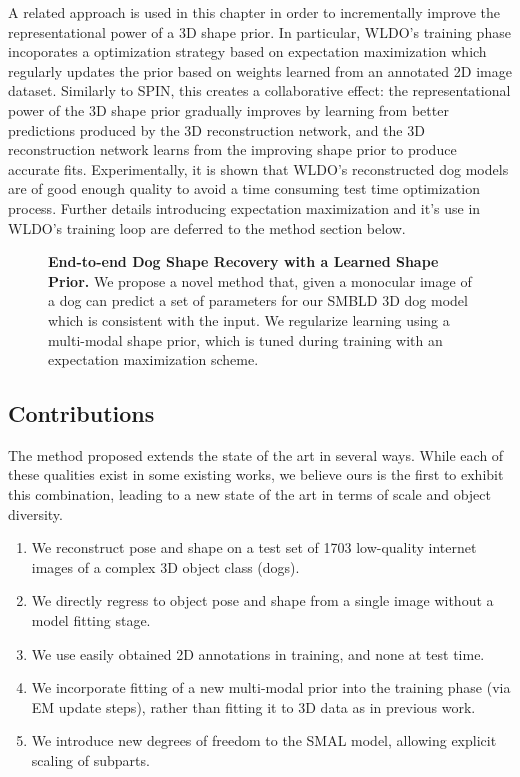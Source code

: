 A related approach is used in this chapter in order to incrementally improve the representational power of a 3D shape prior. In particular, WLDO's training phase incoporates a optimization strategy based on expectation maximization which regularly updates the prior based on weights learned from an annotated 2D image dataset. Similarly to SPIN, this creates a collaborative effect: the representational power of the 3D shape prior gradually improves by learning from better predictions produced by the 3D reconstruction network, and the 3D reconstruction network learns from the improving shape prior to produce accurate fits. Experimentally, it is shown that WLDO's reconstructed dog models are of good enough quality to avoid a time consuming test time optimization process. Further details introducing expectation maximization and it's use in WLDO's training loop are deferred to the method section below.


\begin{figure}[t]
\medbreak
\caption{
\textbf{End-to-end Dog Shape Recovery with a Learned Shape Prior.}
We propose a novel method that, given a monocular image of a dog can predict a set of parameters for our SMBLD 3D dog model which is consistent with the input. We regularize learning using a multi-modal shape prior, which is tuned during training with an expectation maximization scheme.\label{fig:splash}}
\end{figure}

\subsection{Contributions}

The method proposed extends the state of the art in several ways.
While each of these qualities exist in some existing works, we believe ours is the first to exhibit this combination, leading to a new state of the art in terms of scale and object diversity.

\begin{enumerate}
    \item We reconstruct pose and shape on a test set of 1703 low-quality internet images of a complex 3D object class (dogs).
    \item We directly regress to object pose and shape from a single image without a model fitting stage.
    \item We use easily obtained 2D annotations in training, and none at test time.
    \item We incorporate fitting of a new multi-modal prior into the training phase (via EM update steps), rather than fitting it to 3D data as in previous work.
    \item We introduce new degrees of freedom to the SMAL model, 
    allowing explicit scaling of subparts.
\end{enumerate}

